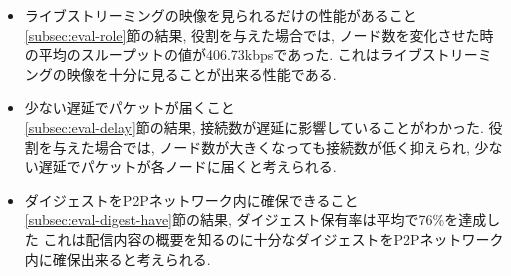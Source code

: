 \begin{itemize}
\item ライブストリーミングの映像を見られるだけの性能があること \\
\ref{subsec:eval-role}節の結果, 役割を与えた場合では, ノード数を変化させた時の平均のスループットの値が406.73kbpsであった. これはライブストリーミングの映像を十分に見ることが出来る性能である.
\item 少ない遅延でパケットが届くこと \\
\ref{subsec:eval-delay}節の結果, 接続数が遅延に影響していることがわかった. 役割を与えた場合では, ノード数が大きくなっても接続数が低く抑えられ, 少ない遅延でパケットが各ノードに届くと考えられる.
\item ダイジェストをP2Pネットワーク内に確保できること \\
\ref{subsec:eval-digest-have}節の結果, ダイジェスト保有率は平均で76\%を達成した これは配信内容の概要を知るのに十分なダイジェストをP2Pネットワーク内に確保出来ると考えられる.
\end{itemize}


